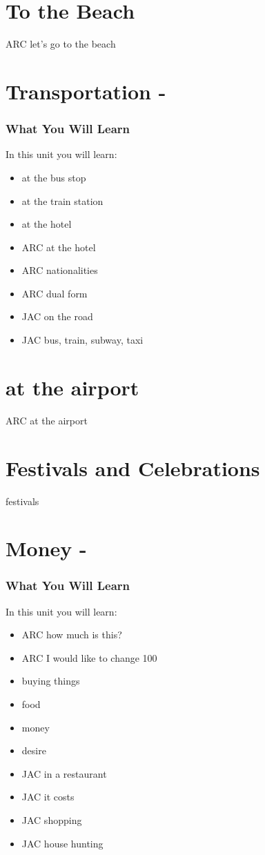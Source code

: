 \newpage{}
\chapter*{To the Beach}
ARC let's go to the beach\\
\index{}
\chapter*{Transportation - }
\subsection{What You Will Learn}
In this unit you will learn:
\begin{itemize}
\item at the bus stop
\item at the train station
\item at the hotel
\item ARC at the hotel
\item ARC nationalities
\item ARC dual form
\item JAC on the road
\item JAC bus, train, subway, taxi
\end{itemize}\newpage

\newpage{}
\chapter*{at the airport}
ARC at the airport\\
\chapter*{Festivals and Celebrations}
festivals\\
\index{}
\chapter*{Money - }
\subsection{What You Will Learn}
In this unit you will learn:
\begin{itemize}
\item ARC how much is this?
\item ARC I would like to change 100
\item buying things
\item food
\item money
\item desire
\item JAC in a restaurant
\item JAC it costs
\item JAC shopping
\item JAC house hunting
\end{itemize}\newpage

